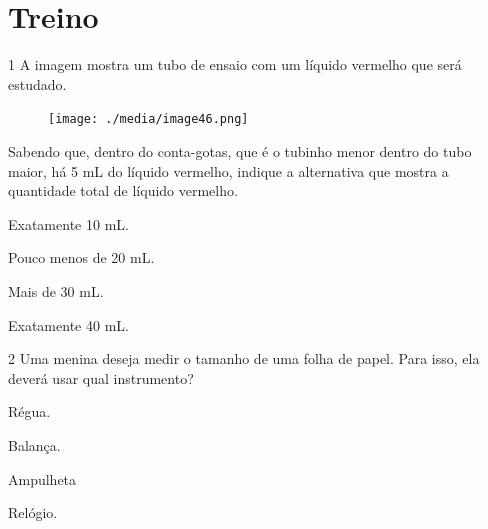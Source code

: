 

\pagebreak
\section*{Treino}

\num{1} A imagem mostra um tubo de ensaio com um líquido vermelho que será estudado.


\begin{figure}[H]
\centering
\texttt{[image: ./media/image46.png]}
\end{figure}

Sabendo que, dentro do conta-gotas, que é o tubinho menor dentro do tubo
maior, há 5 mL do líquido vermelho, indique a alternativa que mostra a
quantidade total de líquido vermelho.

\begin{escolha}[itemsep=-5pt]
\item Exatamente 10 mL.

\item Pouco menos de 20 mL.

\item Mais de 30 mL.

\item Exatamente 40 mL.
\end{escolha}

\num{2} Uma menina deseja medir o tamanho de uma folha de papel. Para isso, ela deverá usar qual instrumento?


\begin{escolha}[itemsep=-5pt]
\item Régua.

\item Balança.

\item Ampulheta

\item Relógio.
\end{escolha}

